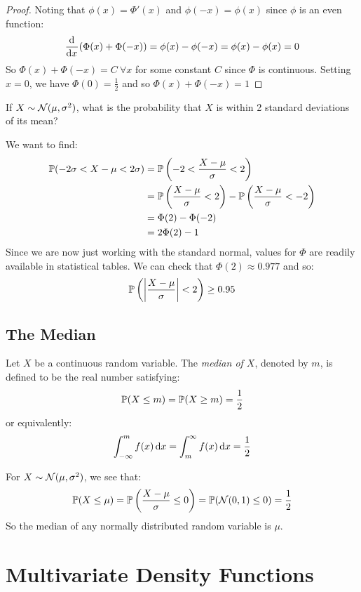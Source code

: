 \documentclass[../main.tex]{subfiles}
\begin{document}
\begin{proof}
  Noting that $\phi(x) = \Phi'(x)$ and $\phi(-x) = \phi(x)$ since $\phi$ is an even function:
  \[
    \deriv{}{x}(\Phi(x) + \Phi(-x)) = \phi(x) - \phi(-x) = \phi(x) - \phi(x) = 0
  \]
  So $\Phi(x) + \Phi(-x) = C\ \forall x$ for some constant $C$ since $\Phi$ is continuous.
  Setting $x = 0$, we have $\Phi(0) = \frac{1}{2}$ and so $\Phi(x) + \Phi(-x) = 1$
\end{proof}
\begin{example} \label{normalSymmetryExample}
  If $X \sim \normal(\mu, \sigma^2)$, what is the probability that $X$ is within 2 standard deviations of its mean?

  We want to find:
  \begin{align*}
    \P(-2 \sigma < X - \mu < 2\sigma) &= \P\left(-2 < \frac{X-\mu}{\sigma} < 2\right) \\
                                      &= \P\left(\frac{X - \mu}{\sigma} < 2\right) - \P\left(\frac{X - \mu}{\sigma} < -2\right) \\
                                      &= \Phi(2) - \Phi(-2) \\
                                      &= 2\Phi(2) - 1
  \end{align*}
  Since we are now just working with the standard normal, values for $\Phi$ are readily available in statistical tables.
  We can check that $\Phi(2) \approx 0.977$ and so:
  \[
    \P\left(\abs{\frac{X - \mu}{\sigma}} < 2\right) \geq 0.95
  \]
\end{example}
\subsection{The Median}
\begin{definition}[Median]
  Let $X$ be a continuous random variable.
  The \textit{median of $X$}, denoted by $m$, is defined to be the real number satisfying:
  \[
    \P(X \leq m) = \P(X \geq m) = \frac{1}{2}
  \]
  or equivalently:
  \[
    \int_{-\infty}^{m} f(x) \d{x} = \int_{m}^{\infty} f(x) \d{x} = \frac{1}{2}
  \]
\end{definition}
\begin{example}
  For $X \sim \normal(\mu, \sigma^2)$, we see that:
  \[
    \P(X \leq \mu) = \P\left(\frac{X - \mu}{\sigma} \leq 0\right) = \P(\normal(0, 1) \leq 0) = \frac{1}{2}
  \]
  So the median of any normally distributed random variable is $\mu$.
\end{example}
\section{Multivariate Density Functions}
\end{document}
